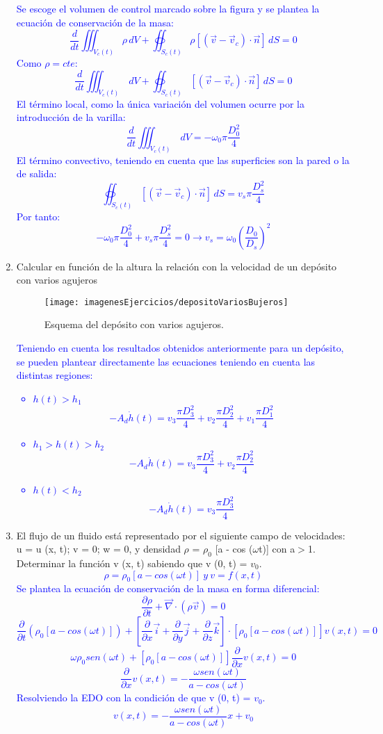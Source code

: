 \begin{enumerate}
\begin{figure}[H]
	\end{figure}
	\textcolor{blue}{
		Se escoge el volumen de control marcado sobre la figura y se plantea la ecuación de conservación de la masa:
	\[\frac{d}{dt}\iiint_{V_c(t)}\rho\,dV+\oiint_{S_c(t)} \rho\left[(\vec{v}-\vec{v}_c)\cdot\vec{n}\right] \,dS=0\]
	Como $\rho=cte$:
	\[\frac{d}{dt}\iiint_{V_c(t)}\,dV+\oiint_{S_c(t)} \left[(\vec{v}-\vec{v}_c)\cdot\vec{n}\right] \,dS=0\]
	El término local, como la única variación del volumen ocurre por la introducción de la varilla:
	\[\frac{d}{dt}\iiint_{V_c(t)}\,dV=-\omega _0 \pi \frac{D^2_0}{4}\]
	El término convectivo, teniendo en cuenta que las superficies son la pared o la de salida:
	\[\oiint_{S_c(t)} \left[(\vec{v}-\vec{v}_c)\cdot\vec{n}\right] \,dS=v_s \pi \frac{D^2_s}{4}\]
	Por tanto:
	\[-\omega _0 \pi \frac{D^2_0}{4}+v_s \pi \frac{D^2_s}{4}=0\rightarrow v_s=\omega _0 \left(\frac{D_0}{D_s}\right)^2\]
	}	
	
	\newpage
	\item Calcular en función de la altura la relación con la velocidad de un depósito con varios agujeros
	\begin{figure}[H]
		\centering
		\texttt{[image: imagenesEjercicios/depositoVariosBujeros]}
		\caption{Esquema del depósito con varios agujeros.}
		\label{fig:depositovariosbujeros}
	\end{figure}
\textcolor{blue}{
Teniendo en cuenta los resultados obtenidos anteriormente para un depósito, se pueden plantear directamente las ecuaciones teniendo en cuenta las distintas regiones:
\begin{itemize}
	\item $h(t)>h_1$
	\[-A_d\dot{h}(t)=v_3\frac{\pi D^2_3}{4}+v_2\frac{\pi D^2_2}{4}+v_1\frac{\pi D^2_1}{4}\]
	\item $h_1>h(t)>h_2$
	\[-A_d\dot{h}(t)=v_3\frac{\pi D^2_3}{4}+v_2\frac{\pi D^2_2}{4}\]
	\item $h(t)<h_2$
	\[-A_d\dot{h}(t)=v_3\frac{\pi D^2_3}{4}\]
\end{itemize}
}

	\newpage
	\item El flujo de un fluido está representado por el siguiente campo de velocidades: u = u (x, t);
	v = 0; w = 0, y densidad $\rho$ =  $\rho _0$ [a - cos ($\omega$t)] con a$>$1. Determinar la función v (x, t)
	sabiendo que v (0, t) = $v_0$.
	\textcolor{blue}{
	\[\rho =  \rho _0 [a - cos (\omega t)] \ y \ v=f(x,t)\]
	Se plantea la ecuación de conservación de la masa en forma diferencial:
	\[\frac{\partial \rho}{\partial t} +\vec{\nabla}\cdot\left(\rho\vec{v}\right)=0\]
	\[\frac{\partial}{\partial t}\left(\rho _0 [a - cos (\omega t)]\right)+\left[\frac{\partial}{\partial x}\vec{i}+
	\frac{\partial}{\partial y}\vec{j}+
	\frac{\partial}{\partial z}\vec{k}\right]\cdot \left[ \rho _0 [a - cos (\omega t)] \right]v(x,t)=0\]
	\[
	\omega \rho _0 sen(\omega t)+\left[ \rho _0 [a - cos (\omega t)] \right]\frac{\partial}{\partial x}v(x,t)=0
	\]
	\[\frac{\partial}{\partial x}v(x,t)=-\frac{\omega sen(\omega t)}{a - cos (\omega t)}\]
	Resolviendo la EDO con la condición de que v (0, t) = $v_0$.
	\[v(x,t)=-\frac{\omega sen(\omega t)}{a - cos (\omega t)}x+v_0\]
	}
\end{enumerate}
\newpage
